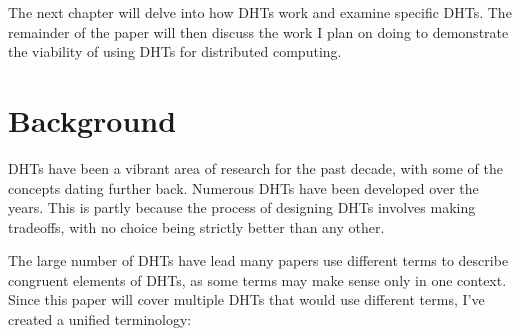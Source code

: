 \documentclass[10pt,letterpaper,twoside]{report}
\begin{document}
The next chapter will delve into how DHTs work and examine specific DHTs.
The remainder of the paper will then discuss the work I plan on doing to demonstrate the viability of using DHTs for distributed computing.





\chapter{Background}
\label{chapter:background}

DHTs have been a vibrant area of research for the past decade, with some of the concepts dating further back.
Numerous DHTs have been developed over the years.
This is partly because the process of designing DHTs involves making tradeoffs, with no choice being strictly better than any other.

The large number of DHTs have lead many papers use different terms to describe congruent elements of DHTs, as some terms may make sense only in one context.
Since this paper will cover multiple DHTs that would use different terms,  I've created a unified terminology:
\end{document}
